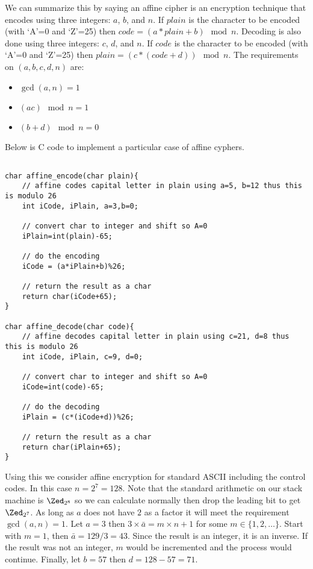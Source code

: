 We can summarize this by saying an affine cipher is an encryption technique that encodes using three integers: $a$, $b$, and $n$.  If $plain$ is the character to be encoded (with `A'=0 and `Z'=25) then $code=(a*plain+b) \mod n$.  Decoding is also done using three integers: $c$, $d$, and $n$.  If $code$ is the character to be encoded (with `A'=0 and `Z'=25) then $plain=(c*(code+d)) \mod n$.  The requirements on $(a,b,c,d,n)$ are:
\begin{itemize}
    \item $\gcd(a,n)=1$
    \item $(ac) \mod n = 1$
    \item $(b+d) \mod n = 0$
\end{itemize}
Below is C code to implement a particular case of affine cyphers.
\begin{verbatim}

char affine_encode(char plain){
    // affine codes capital letter in plain using a=5, b=12 thus this is modulo 26
    int iCode, iPlain, a=3,b=0;

    // convert char to integer and shift so A=0
    iPlain=int(plain)-65;

    // do the encoding
    iCode = (a*iPlain+b)%26;

    // return the result as a char
    return char(iCode+65);
}

char affine_decode(char code){
    // affine decodes capital letter in plain using c=21, d=8 thus this is modulo 26
    int iCode, iPlain, c=9, d=0;

    // convert char to integer and shift so A=0
    iCode=int(code)-65;

    // do the decoding
    iPlain = (c*(iCode+d))%26;

    // return the result as a char
    return char(iPlain+65);
}
\end{verbatim}


Using this we consider affine encryption for standard ASCII including the control codes.  In this case $n=2^7=128$.  Note that the standard arithmetic on our stack machine is $\Zed_{2^8}$ so we can calculate normally then drop the leading bit to get $\Zed_{2^7}$.  As long as $a$ does not have $2$ as a factor it will meet the requirement $\gcd(a,n)=1$.  Let $a=3$ then $3\times\bar a = m\times n+1$ for some $m\in\{1,2,\ldots\}$.  Start with $m=1$, then $\bar a = 129/3 = 43$.  Since the result is an integer, it is an inverse.  If the result was not an integer, $m$ would be incremented and the process would continue.  Finally, let $b=57$ then $d=128-57=71$.

